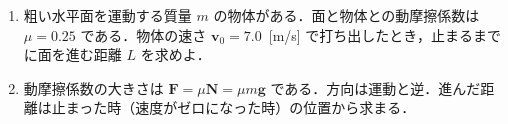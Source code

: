 \documentclass[a4paper,11pt]{ltjsarticle}
\begin{document}
\begin{enumerate}
\begin{itemize}
    \item ボールが地面に戻る時刻とその地点を答えなさい．
    
    ボールが地面に戻る時間は，$y(t)=0$ より，
    \begin{equation}
      0=-\dfrac{1}{2}gt^{2}+Ct+D
    \end{equation}

    初期条件を考慮に入れると，
    \begin{equation}
      \renewcommand{\arraystretch}{2}
      \begin{array}{rl}
        & 0=-\dfrac{1}{2} \times 9.8t^{2}+19.6 \times \dfrac{1}{2}t
        \\
        \Leftrightarrow
        & 0=-4.9t^{2}+9.8t
        \\
        \Leftrightarrow
        & t=2
        \\
        \therefore
        & x(2)=19.6 \sqrt{3}
      \end{array}
    \end{equation}

  \clearpage

    \item ボールの最高点の高さを答えなさい．
    
    ボールが最高点に到達するまでの時間は，戻ってくるまでの時間の半分なので1秒となる．
    \begin{equation}
      \renewcommand{\arraystretch}{2}
      \begin{array}{rcl}
        \therefore\ y(1)
        &=&
        -\dfrac{1}{2} \times 9.8 \times 1^{2} + 19.6 \times \dfrac{1}{2} \times 1
        \\
        &=&
        4.9
      \end{array}
    \end{equation}
  \end{itemize}

  \item 粗い水平面を運動する質量 $m$ の物体がある．面と物体との動摩擦係数は $\mu = 0.25$ である．物体の速さ $\bm{v}_{0}=7.0$\ [m/s] で打ち出したとき，止まるまでに面を進む距離 $L$ を求めよ．\\[-10pt]
  \item[HINT] 動摩擦係数の大きさは $\bm{F}=\mu \bm{N}=\mu m\bm{g}$ である．方向は運動と逆．進んだ距離は止まった時（速度がゼロになった時）の位置から求まる．


\end{enumerate}
\end{document}
